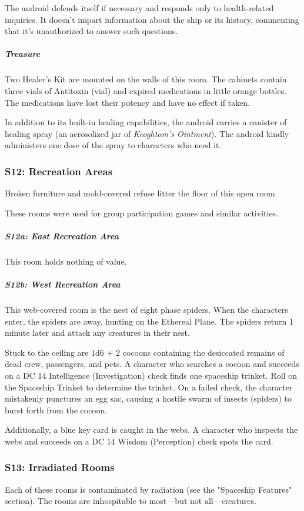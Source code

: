 \documentclass[10pt,a4paper,twoside,bg=print,twocolumn,openany,nodeprecatedcode]{dndbook}
\begin{document}
The android defends itself if necessary and responds only to health-related inquiries. It doesn't impart information about the ship or its history, commenting that it's unauthorized to answer such questions.

\subparagraph{Treasure}
Two Healer's Kit are mounted on the walls of this room. The cabinets contain three vials of Antitoxin (vial) and expired medications in little orange bottles. The medications have lost their potency and have no effect if taken.

In addition to its built-in healing capabilities, the android carries a canister of healing spray (an aerosolized jar of \textit{Keoghtom's Ointment}). The android kindly administers one dose of the spray to characters who need it.

\subsubsection{S12: Recreation Areas}
\begin{DndReadAloud}{}
Broken furniture and mold-covered refuse litter the floor of this open room.

\end{DndReadAloud}

These rooms were used for group participation games and similar activities.

\subparagraph{S12a: East Recreation Area}
This room holds nothing of value.

\subparagraph{S12b: West Recreation Area}
This web-covered room is the nest of eight phase spiders. When the characters enter, the spiders are away, hunting on the Ethereal Plane. The spiders return 1 minute later and attack any creatures in their nest.

Stuck to the ceiling are 1d6 + 2 cocoons containing the desiccated remains of dead crew, passengers, and pets. A character who searches a cocoon and succeeds on a DC 14 Intelligence (Investigation) check finds one spaceship trinket. Roll on the Spaceship Trinket to determine the trinket. On a failed check, the character mistakenly punctures an egg sac, causing a hostile swarm of insects (spiders) to burst forth from the cocoon.

Additionally, a blue key card is caught in the webs. A character who inspects the webs and succeeds on a DC 14 Wisdom (Perception) check spots the card.

\subsubsection{S13: Irradiated Rooms}
Each of these rooms is contaminated by radiation (see the "Spaceship Features" section). The rooms are inhospitable to most—but not all—creatures.
\end{document}

